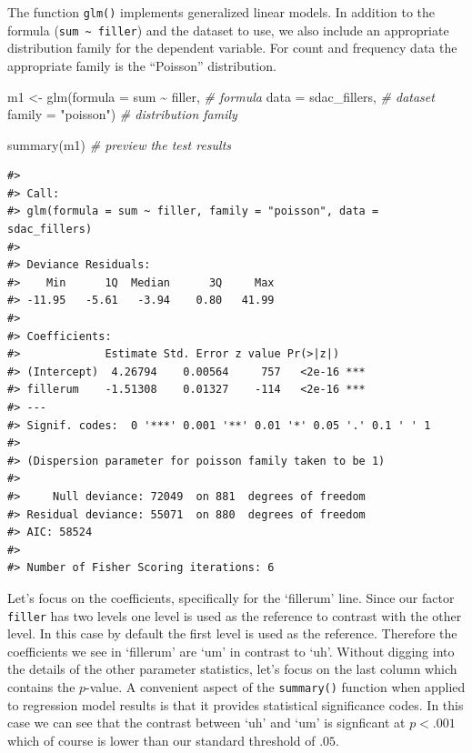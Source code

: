 \documentclass[
  letterpaper,
]{latex/krantz}
\newenvironment{Shaded}{\begin{snugshade}}{\end{snugshade}}
\newcommand{\AttributeTok}[1]{\textcolor[rgb]{0.00,0.00,0.00}{#1}}
\newcommand{\CommentTok}[1]{\textcolor[rgb]{0.00,0.00,0.00}{\textit{#1}}}
\newcommand{\FunctionTok}[1]{\textcolor[rgb]{0.00,0.00,0.00}{#1}}
\newcommand{\NormalTok}[1]{\textcolor[rgb]{0.00,0.00,0.00}{#1}}
\newcommand{\OtherTok}[1]{\textcolor[rgb]{0.00,0.00,0.00}{#1}}
\newcommand{\SpecialCharTok}[1]{\textcolor[rgb]{0.00,0.00,0.00}{#1}}
\newcommand{\StringTok}[1]{\textcolor[rgb]{0.00,0.00,0.00}{#1}}
\begin{document}
The function \texttt{glm()} implements generalized linear models. In
addition to the formula (\texttt{sum\ \textasciitilde{}\ filler}) and
the dataset to use, we also include an appropriate distribution family
for the dependent variable. For count and frequency data the appropriate
family is the ``Poisson'' distribution.

\begin{Shaded}
\begin{Highlighting}[]
\NormalTok{m1 }\OtherTok{\textless{}{-}} 
  \FunctionTok{glm}\NormalTok{(}\AttributeTok{formula =}\NormalTok{ sum }\SpecialCharTok{\textasciitilde{}}\NormalTok{ filler, }\CommentTok{\# formula}
      \AttributeTok{data =}\NormalTok{ sdac\_fillers, }\CommentTok{\# dataset}
      \AttributeTok{family =} \StringTok{"poisson"}\NormalTok{) }\CommentTok{\# distribution family}

\FunctionTok{summary}\NormalTok{(m1) }\CommentTok{\# preview the test results}
\end{Highlighting}
\end{Shaded}

\begin{verbatim}
#> 
#> Call:
#> glm(formula = sum ~ filler, family = "poisson", data = sdac_fillers)
#> 
#> Deviance Residuals: 
#>    Min      1Q  Median      3Q     Max  
#> -11.95   -5.61   -3.94    0.80   41.99  
#> 
#> Coefficients:
#>             Estimate Std. Error z value Pr(>|z|)    
#> (Intercept)  4.26794    0.00564     757   <2e-16 ***
#> fillerum    -1.51308    0.01327    -114   <2e-16 ***
#> ---
#> Signif. codes:  0 '***' 0.001 '**' 0.01 '*' 0.05 '.' 0.1 ' ' 1
#> 
#> (Dispersion parameter for poisson family taken to be 1)
#> 
#>     Null deviance: 72049  on 881  degrees of freedom
#> Residual deviance: 55071  on 880  degrees of freedom
#> AIC: 58524
#> 
#> Number of Fisher Scoring iterations: 6
\end{verbatim}

Let's focus on the coefficients, specifically for the `fillerum' line.
Since our factor \texttt{filler} has two levels one level is used as the
reference to contrast with the other level. In this case by default the
first level is used as the reference. Therefore the coefficients we see
in `fillerum' are `um' in contrast to `uh'. Without digging into the
details of the other parameter statistics, let's focus on the last
column which contains the \(p\)-value. A convenient aspect of the
\texttt{summary()} function when applied to regression model results is
that it provides statistical significance codes. In this case we can see
that the contrast between `uh' and `um' is signficant at \(p < .001\)
which of course is lower than our standard threshold of \(.05\).
\end{document}
